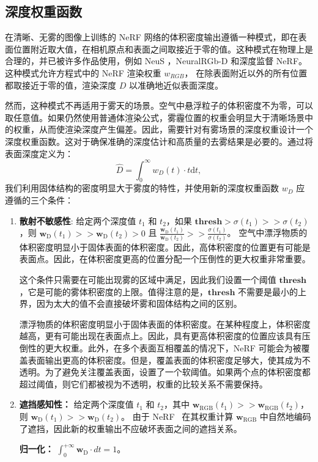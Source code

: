 \subsection{深度权重函数}
在清晰、无雾的图像上训练的 NeRF 网络的体积密度输出遵循一种模式，即在表面位置附近取大值，在相机原点和表面之间取接近于零的值。这种模式在物理上是合理的，并已被许多作品使用，例如 NeuS \cite{wang_neus_2021}，NeuralRGb-D\cite{azinovic_neural_2022} 和深度监督 NeRF\cite{deng_depth-supervised_2022}。这种模式允许方程式中的 NeRF 渲染权重 $w_{RGB}$， 在除表面附近以外的所有位置都取接近于零的值，渲染深度 $D$ 以准确地近似表面深度。

然而，这种模式不再适用于雾天的场景。空气中悬浮粒子的体积密度不为零，可以取任意值。如果仍然使用普通体渲染公式，雾霾位置的权重会明显大于清晰场景中的权重，从而使渲染深度产生偏差。因此，需要针对有雾场景的深度权重设计一个深度权重函数。这对于确保准确的深度估计和高质量的去雾结果是必要的。通过将表面深度定义为：
\begin{equation}
    \hat{D} =\int_0^\infty w_D(t)\cdot t\text{d}t,
\end{equation}
我们利用固体结构的密度明显大于雾度的特性，并使用新的深度权重函数 $w_D$ 应遵循的三个条件：
\begin{enumerate}
    \item \textbf{散射不敏感性}: 给定两个深度值 $t_1$ 和 $t_2$，如果 $\mathbf{thresh} > \sigma (t_1) >> \sigma (t_2)$，则 $ \mathbf{w}_\text{D}(t_1) >> \mathbf{w}_\text{D}(t_2) > 0$ 且 $\frac{\mathbf{w}_\text{D}(t_1)}{\mathbf{w}_\text{D}(t_2)} >> \frac{\sigma (t_1)}{\sigma (t_2)}$。
空气中漂浮物质的体积密度明显小于固体表面的体积密度。因此，高体积密度的位置更有可能是表面点。因此，在体积密度更高的位置分配一个压倒性的更大权重非常重要。

这个条件只需要在可能出现雾的区域中满足，因此我们设置一个阈值 $\mathbf{thresh}$，它是可能的雾体积密度的上限。值得注意的是，$\mathbf{thresh}$ 不需要是最小的上界，因为太大的值不会直接破坏雾和固体结构之间的区别。

漂浮物质的体积密度明显小于固体表面的体积密度。在某种程度上，体积密度越高，更有可能出现在表面点上。因此，具有更高体积密度的位置应该具有压倒性的更大权重。此外，在多个表面互相覆盖的情况下，NeRF 可能会为被覆盖表面输出更高的体积密度。但是，覆盖表面的体积密度足够大，使其成为不透明。为了避免关注覆盖表面，设置了一个软阈值。如果两个点的体积密度都超过阈值，则它们都被视为不透明，权重的比较关系不需要保持。

\item \textbf{遮挡感知性：} 给定两个深度值 $t_1$ 和 $t_2$，其中 $\mathbf{w}_\text{RGB}(t_1) >> \mathbf{w}_\text{RGB}(t_2)$，则 $ \mathbf{w}_\text{D}(t_1) >> \mathbf{w}_\text{D}(t_2)$。
由于 NeRF~\cite{mildenhall_nerf_2020} 在其权重计算 $\mathbf{w}_\text{RGB}$ 中自然地编码了遮挡，因此新的权重输出不应破坏表面之间的遮挡关系。


\textbf{归一化：} $ \int_0^{+\infty} \mathbf{w}_\text{D} \cdot {d}t = 1 $。
\end{enumerate}

